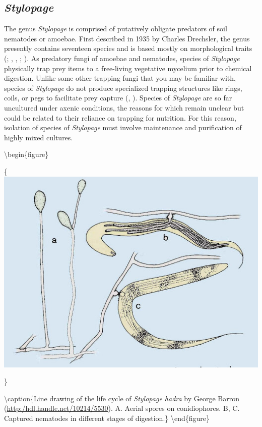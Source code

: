 \documentclass[]{book}
\begin{document}
\hypertarget{stylopage}{%
\subsection{\texorpdfstring{\emph{Stylopage}}{Stylopage}}\label{stylopage}}

The genus \emph{Stylopage} is comprised of putatively obligate predators of soil nematodes or amoebae. First described in 1935 by Charles Drechsler, the genus presently contains seventeen species and is based mostly on morphological traits (\citet{Barron_1977}; \citet{Drechsler_1935A}, \citeyearpar{Drechsler_1935B}, \citet{Drechsler_1939}; \citet{Duddington_1955}). As predatory fungi of amoebae and nematodes, species of \emph{Stylopage} physically trap prey items to a free-living vegetative mycelium prior to chemical digestion. Unlike some other trapping fungi that you may be familiar with, species of \emph{Stylopage} do not produce specialized trapping structures like rings, coils, or pegs to facilitate prey capture (\citet{Drechsler_1935A}, \citet{Drechsler_1937}). Species of \emph{Stylopage} are so far uncultured under axenic conditions, the reasons for which remain unclear but could be related to their reliance on trapping for nutrition. For this reason, isolation of species of \emph{Stylopage} must involve maintenance and purification of highly mixed cultures.

\textbackslash begin\{figure\}

\{\centering \includegraphics{img/Ch3_Fig2}

\}

\textbackslash caption\{Line drawing of the life cycle of \emph{Stylopage hadra} by George Barron (\url{http:/hdl.handle.net/10214/5530}). A. Aerial spores on conidiophores. B, C. Captured nematodes in different stages of digestion.\}\label{fig:ch3fig2}
\textbackslash end\{figure\}
\end{document}
